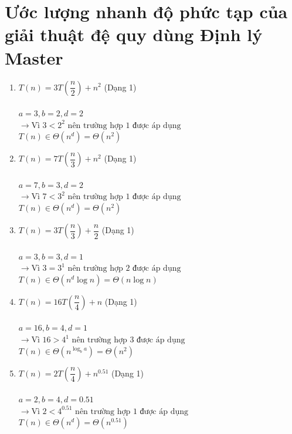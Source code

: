 \documentclass[12pt, letterpaper]{article}
\begin{document}
\section{Ước lượng nhanh độ phức tạp của giải thuật đệ quy dùng Định lý Master}
\begin{enumerate}[label=\bfseries\large\theenumi.]
    \item $ T(n) = 3T\left( \dfrac{n}{2} \right) + n^2 $ (Dạng 1) \\ \\
        $ a = 3, b = 2, d = 2 $ \\
        $ \rightarrow \text{Vì } 3 < 2^2 \text{ nên trường hợp 1 được áp dụng} $ \\
        $ T(n) \in \Theta(n^d) = \Theta(n^2) $

    \item $ T(n) = 7T\left( \dfrac{n}{3} \right) + n^2 $ (Dạng 1) \\ \\
        $ a = 7, b = 3, d = 2 $ \\
        $ \rightarrow \text{Vì } 7 < 3^2 \text{ nên trường hợp 1 được áp dụng} $ \\
        $ T(n) \in \Theta(n^d) = \Theta(n^2) $

    \item $ T(n) = 3T\left( \dfrac{n}{3} \right) + \dfrac{n}{2} $ (Dạng 1) \\ \\
        $ a = 3, b = 3, d = 1 $ \\
        $ \rightarrow \text{Vì } 3 = 3^1 \text{ nên trường hợp 2 được áp dụng} $ \\
        $ T(n) \in \Theta(n^d\log n) = \Theta(n\log n) $

    \item $ T(n) = 16T\left( \dfrac{n}{4} \right) + n $ (Dạng 1) \\ \\
        $ a = 16, b = 4, d = 1 $ \\
        $ \rightarrow \text{Vì } 16 > 4^1 \text{ nên trường hợp 3 được áp dụng} $ \\
        $ T(n) \in \Theta(n^{\log_b a}) = \Theta(n^2) $

    \item $ T(n) = 2T\left( \dfrac{n}{4} \right) + n^{0.51} $ (Dạng 1) \\ \\
        $ a = 2, b = 4, d = 0.51 $ \\
        $ \rightarrow \text{Vì } 2 < 4^{0.51} \text{ nên trường hợp 1 được áp dụng} $ \\
        $ T(n) \in \Theta(n^d) = \Theta(n^{0.51}) $


\end{enumerate}
\end{document}
